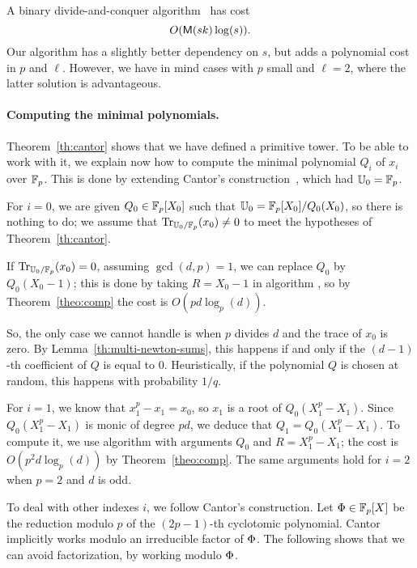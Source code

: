 \begin{nota}
  A binary divide-and-conquer algorithm~\cite[Exercise~9.20]{vzGG} has
  cost 
  \[O(\mathsf{M}(sk)\log(s))\text{.}\] Our algorithm has a slightly better
  dependency on $s$, but adds a polynomial cost in $p$ and
  $\ell$. However, we have in mind cases with $p$ small and $\ell=2$,
  where the latter solution is advantageous.
\end{nota}

\paragraph{Computing the minimal polynomials.}
Theorem~\ref{th:cantor} shows that we have defined a primitive
tower. To be able to work with it, we explain now how to compute the
minimal polynomial $Q_i$ of $x_i$ over $\mathbb{F}_p$. This is done by
extending Cantor's construction~\cite{cantor89}, which had $\mathbb{U}_0=\mathbb{F}_p$.

For $i=0$, we are given $Q_0\in\mathbb{F}_p[X_0]$ such that
$\mathbb{U}_0=\mathbb{F}_p[X_0]/Q_0(X_0)$, so there is nothing to do; we assume that
$\operatorname{Tr}_{\mathbb{U}_0/\mathbb{F}_p}(x_0)\ne0$ to meet the hypotheses of
Theorem~\ref{th:cantor}. 

\begin{remark}
  \label{rk:comp-minim-polyn}
  If $\operatorname{Tr}_{\mathbb{U}_0/\mathbb{F}_p}(x_0)=0$, assuming $\gcd(d,p)=1$, we can replace
  $Q_0$ by $Q_0(X_0-1)$; this is done by taking $R=X_0-1$ in algorithm
  \hyperref[alg:compose]{}, so by Theorem~\ref{theo:comp} the cost is $O(pd
  \log_p(d))$.

  So, the only case we cannot handle is when $p$ divides $d$ and the
  trace of $x_0$ is zero. By Lemma~\ref{th:multi-newton-sums}, this
  happens if and only if the $(d-1)$-th coefficient of $Q$ is equal to
  $0$. Heuristically, if the polynomial $Q$ is chosen at random, this
  happens with probability $1/q$.
\end{remark}

For $i=1$, we know that $x_1^p-x_1=x_0$, so $x_1$ is a root of
$Q_0(X_1^p-X_1)$. Since $Q_0(X_1^p-X_1)$ is monic of degree $pd$, we
deduce that $Q_1=Q_0(X_1^p-X_1)$. To compute it, we use algorithm
\hyperref[alg:compose]{} with arguments $Q_0$ and $R=X_1^p-X_1$; the cost is
$O(p^2d \log_p(d))$ by Theorem~\ref{theo:comp}. The same arguments
hold for $i=2$ when $p=2$ and $d$ is odd.

To deal with other indexes $i$, we follow Cantor's construction.  Let
$\Phi\in \mathbb{F}_p[X]$ be the reduction modulo $p$ of the $(2p-1)$-th
cyclotomic polynomial. Cantor implicitly works modulo an irreducible
factor of $\Phi$. The following shows that we can avoid
factorization, by working modulo $\Phi$.

